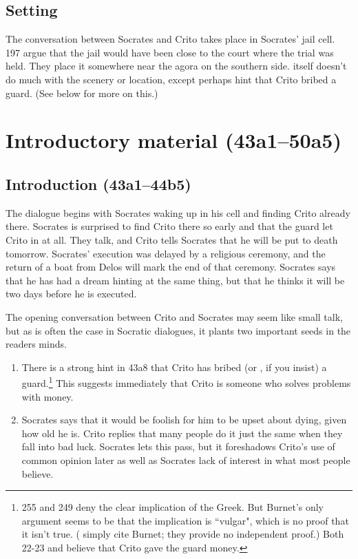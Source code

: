 \documentclass[11pt]{article}
\begin{document}
\subsection{Setting}

The conversation between Socrates and Crito takes place in Socrates' jail cell.  \citet{brickhouse2004} 197 argue that the jail would have been close to the court where the trial was held.  They place it somewhere near the agora on the southern side.   itself doesn't do much with the scenery or location, except perhaps hint that Crito bribed a guard.  (See below for more on this.)

\section{Introductory material (43a1--50a5)}

\subsection{Introduction (43a1--44b5)}

The dialogue begins with Socrates waking up in his cell and finding Crito already there.  Socrates is surprised to find Crito there so early and that the guard let Crito in at all.  They talk, and Crito tells Socrates that he will be put to death tomorrow.  Socrates' execution was delayed by a religious ceremony, and the return of a boat from Delos will mark the end of that ceremony.  Socrates says that he has had a dream hinting at the same thing, but that he thinks it will be two days before he is executed.

The opening conversation between Crito and Socrates may seem like small talk, but as is often the case in Socratic dialogues, it plants two important seeds in the readers minds.

\begin{enumerate}
    \item There is a strong hint in 43a8 that Crito has bribed (or , if you insist) a guard.\footnote{\citet{burnet1924} 255 and \citet{brickhouse2004} 249 deny the clear implication of the Greek.  But Burnet's only argument seems to be that the implication is ``vulgar", which is no proof that it isn't true.  (\citet{brickhouse2004} simply cite Burnet; they provide no independent proof.)  Both \citet{adam1988} 22-23 and \citet{rose1983} believe that Crito gave the guard money.}  This suggests immediately that Crito is someone who solves problems with money.
    \item Socrates says that it would be foolish for him to be upset about dying, given how old he is.  Crito replies that many people do it just the same when they fall into bad luck.  Socrates lets this pass, but it foreshadows Crito's use of common opinion later as well as Socrates lack of interest in what most people believe.
\end{enumerate}
\end{document}

